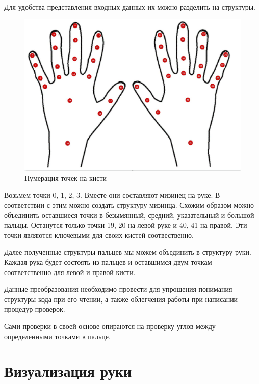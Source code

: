 \hspace{0.6cm}Для удобства представления входных данных их можно разделить на структуры. 
\begin{figure}[ht!]
	\centering
	\includegraphics[scale=0.5]{Kist.jpg}
	\caption{Нумерация точек на кисти}
	\label{fig:hands}
\end{figure}
\hspace{0.6cm}Возьмем точки 0, 1, 2, 3. Вместе они составляют мизинец на руке. В соответствии с этим можно создать структуру мизинца. Схожим образом можно объединить оставшиеся точки в безымянный, средний, указательный и большой пальцы. Останутся только точки 19, 20 на левой руке и 40, 41 на правой. Эти точки являются ключевыми для своих кистей соотвественно.

\hspace{0.6cm}Далее полученные структуры пальцев мы можем объединить в структуру руки. Каждая рука будет состоять из пальцев и оставшимся двум точкам соответственно для левой и правой кисти.

\hspace{0.6cm}Данные преобразования необходимо провести для упрощения понимания структуры кода при его чтении, а также облегчения работы при написании процедур проверок.

\hspace{0.6cm}Сами проверки в своей основе опираются на проверку углов между определенными точками в пальце.  

\section{Визуализация руки}

